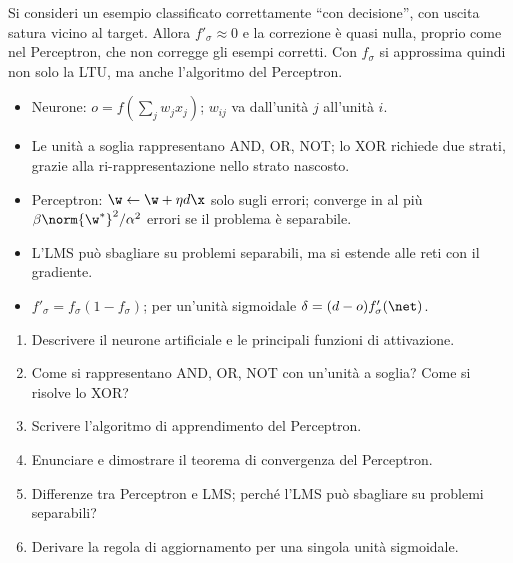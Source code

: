 \begin{idea}
Si consideri un esempio classificato correttamente ``con decisione'', con uscita satura vicino al target. Allora
$f'_\sigma\approx0$ e la correzione è quasi nulla, proprio come nel Perceptron, che non corregge gli esempi
corretti. Con $f_\sigma$ si approssima quindi non solo la LTU, ma anche l'algoritmo del Perceptron.
\end{idea}

\begin{puntichiave}
\begin{itemize}
  \item Neurone: $o = f(\sum_jw_jx_j)$; $w_{ij}$ va dall'unità $j$ all'unità $i$.
  \item Le unità a soglia rappresentano AND, OR, NOT; lo XOR richiede due strati, grazie alla ri-rappresentazione
        nello strato nascosto.
  \item Perceptron: $\w\leftarrow\w+\eta d\x$ solo sugli errori; converge in al più $\beta\norm{\w^*}^2/\alpha^2$
        errori se il problema è separabile.
  \item L'LMS può sbagliare su problemi separabili, ma si estende alle reti con il gradiente.
  \item $f'_\sigma = f_\sigma(1-f_\sigma)$; per un'unità sigmoidale $\delta = (d-o)f'_\sigma(\net)$.
\end{itemize}
\end{puntichiave}

\begin{domande}
\begin{enumerate}
  \item Descrivere il neurone artificiale e le principali funzioni di attivazione.
  \item Come si rappresentano AND, OR, NOT con un'unità a soglia? Come si risolve lo XOR?
  \item Scrivere l'algoritmo di apprendimento del Perceptron.
  \item Enunciare e dimostrare il teorema di convergenza del Perceptron.
  \item Differenze tra Perceptron e LMS; perché l'LMS può sbagliare su problemi separabili?
  \item Derivare la regola di aggiornamento per una singola unità sigmoidale.
\end{enumerate}
\end{domande}
